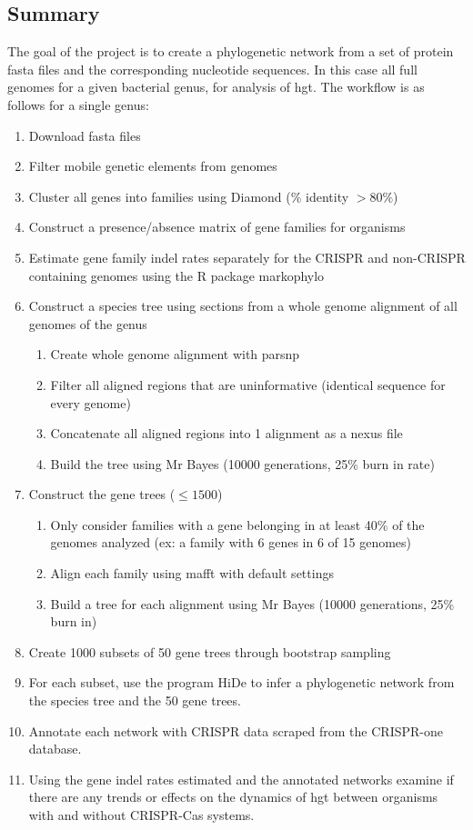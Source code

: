 \subsection{Summary}
The goal of the project is to create a phylogenetic network from a set of protein fasta files and the corresponding nucleotide sequences.
In this case all full genomes for a given bacterial genus, for analysis of \ac{hgt}.
The workflow is as follows for a single genus:
\begin{enumerate}
    \item Download fasta files
    \item Filter mobile genetic elements from genomes
    \item Cluster all genes into families using Diamond (\% identity $> 80\%$)
    \item Construct a presence/absence matrix of gene families for organisms
    \item Estimate gene family indel rates separately for the CRISPR and non-CRISPR containing genomes using the R package markophylo
    \item Construct a species tree using sections from a whole genome alignment of all genomes of the genus
    \begin{enumerate}
        \item Create whole genome alignment with parsnp
        \item Filter all aligned regions that are uninformative (identical sequence for every genome)
        \item Concatenate all aligned regions into 1 alignment as a nexus file
        \item Build the tree using Mr Bayes (10000 generations, 25\% burn in rate)
    \end{enumerate}
    \item Construct the gene trees ($\leq 1500$)
    \begin{enumerate}
        \item Only consider families with a gene belonging in at least 40\% of the genomes analyzed (ex: a family with 6 genes in 6 of 15 genomes)
        \item Align each family using mafft with default settings
        \item Build a tree for each alignment using Mr Bayes (10000 generations, 25\% burn in)
    \end{enumerate}
    \item Create 1000 subsets of 50 gene trees through bootstrap sampling
    \item For each subset, use the program HiDe to infer a phylogenetic network from the species tree and the 50 gene trees.
    \item Annotate each network with CRISPR data scraped from the CRISPR-one database.
    \item Using the gene indel rates estimated and the annotated networks examine if there are any trends or effects on the dynamics of \ac{hgt} between organisms with and without CRISPR-Cas systems.
\end{enumerate}
